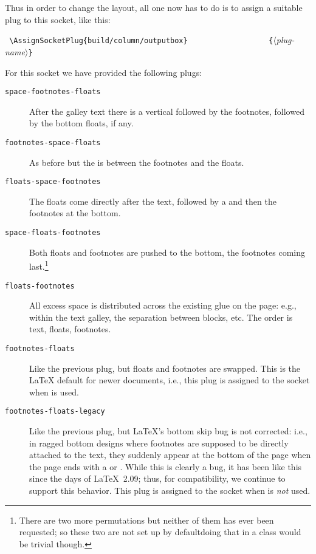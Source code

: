\documentclass{ltnews}
\providecommand\Dash {\unskip \textemdash}
\providecommand\plug[1]{\texttt{#1}}
\providecommand\meta[1]{$\langle$\textrm{\itshape#1}$\rangle$}
\begin{document}
Thus in order to change the layout, all one now has to do is to assign
a suitable plug to this socket, like this:
\begin{flushleft}
  \verb= \AssignSocketPlug{build/column/outputbox}=
  \verb=                  {=\meta{plug-name}\verb=}=
\end{flushleft}
%
For this socket we have provided the following plugs:
\begin{description}
\item[\plug{space-footnotes-floats}]

   After the galley text there is a vertical  followed by the
   footnotes, followed by the bottom floats, if any.

\item[\plug{footnotes-space-floats}]

   As before but the  is between the footnotes and the
   floats.

\item[\plug{floats-space-footnotes}]

   The floats come directly after the text, followed by a 
   and then the footnotes at the bottom.

\item[\plug{space-floats-footnotes}]

   Both floats and footnotes are pushed to the bottom, the footnotes
   coming last.\footnote{There are two more permutations but neither
   of them has ever been requested; so these two are not set up by
   default\Dash doing that in a class would be trivial though.}

\item[\plug{floats-footnotes}]

   All excess space is distributed across the existing glue on the
   page: e.g., within the text galley, the separation between blocks,
   etc.  The order is text, floats, footnotes.

\item[\plug{footnotes-floats}]

   Like the previous plug, but floats and footnotes are swapped. This
   is the \LaTeX{} default for newer documents, i.e., this plug is
   assigned to the socket when  is used.

\item[\plug{footnotes-floats-legacy}]

   Like the previous plug, but \LaTeX{}'s bottom skip bug is not
   corrected: i.e., in ragged bottom designs where footnotes are
   supposed to be directly attached to the text, they suddenly appear
   at the bottom of the page when the page ends with a  or
   .  While this is clearly a bug, it has been like this
   since the days of \LaTeX~2.09; thus, for compatibility, we continue
   to support this behavior.  This plug is assigned to the socket when
    is \emph{not} used.
\end{description}
\end{document}
